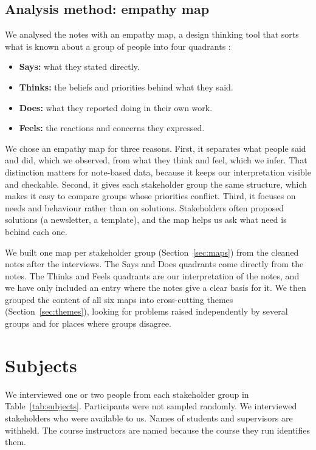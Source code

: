 \documentclass{article}
\begin{document}
    \subsection{Analysis method: empathy map}

    We analysed the notes with an empathy map, a design thinking tool that
    sorts what is known about a group of people into four quadrants
    \citep{gray2010gamestorming, gibbons2018empathy}:

    \begin{itemize}
        \item \textbf{Says:} what they stated directly.
        \item \textbf{Thinks:} the beliefs and priorities behind what they said.
        \item \textbf{Does:} what they reported doing in their own work.
        \item \textbf{Feels:} the reactions and concerns they expressed.
    \end{itemize}

    We chose an empathy map for three reasons. First, it separates what people
    said and did, which we observed, from what they think and feel, which we
    infer. That distinction matters for note-based data, because it keeps our
    interpretation visible and checkable. Second, it gives each stakeholder
    group the same structure, which makes it easy to compare groups whose
    priorities conflict. Third, it focuses on needs and behaviour rather than
    on solutions. Stakeholders often proposed solutions (a newsletter, a
    template), and the map helps us ask what need is behind each one.

    We built one map per stakeholder group (Section~\ref{sec:maps}) from the cleaned
    notes after the interviews. The Says and Does quadrants come directly from
    the notes. The Thinks and Feels quadrants are our interpretation of the
    notes, and we have only included an entry where the notes give a clear basis
    for it. We then grouped the content of all six maps into cross-cutting themes
    (Section~\ref{sec:themes}), looking for problems raised independently by
    several groups and for places where groups disagree.

    \section{Subjects}
    \label{sec:subjects}

    We interviewed one or two people from each stakeholder group in Table~\ref{tab:subjects}.
    Participants were not sampled randomly. We interviewed stakeholders who were
    available to us. Names of students and supervisors are withheld. The course
    instructors are named because the course they run identifies them.
\end{document}
